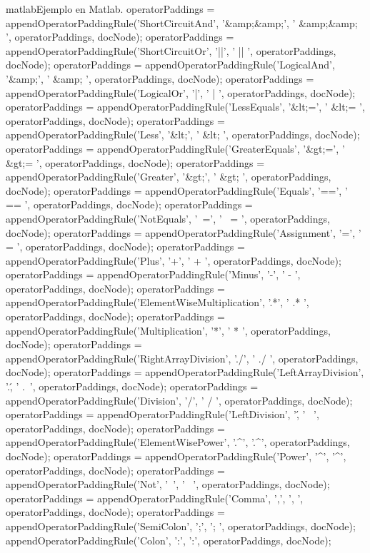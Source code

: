 \begin{sourcecode}{matlab}{Ejemplo en Matlab.}
            operatorPaddings = appendOperatorPaddingRule('ShortCircuitAnd', '&amp;&amp;', ' &amp;&amp; ', operatorPaddings, docNode);
            operatorPaddings = appendOperatorPaddingRule('ShortCircuitOr', '||', ' || ', operatorPaddings, docNode);
            operatorPaddings = appendOperatorPaddingRule('LogicalAnd', '&amp;', ' &amp; ', operatorPaddings, docNode);
            operatorPaddings = appendOperatorPaddingRule('LogicalOr', '|', ' | ', operatorPaddings, docNode);
            operatorPaddings = appendOperatorPaddingRule('LessEquals', '&lt;=', ' &lt;= ', operatorPaddings, docNode);
            operatorPaddings = appendOperatorPaddingRule('Less', '&lt;', ' &lt; ', operatorPaddings, docNode);
            operatorPaddings = appendOperatorPaddingRule('GreaterEquals', '&gt;=', ' &gt;= ', operatorPaddings, docNode);
            operatorPaddings = appendOperatorPaddingRule('Greater', '&gt;', ' &gt; ', operatorPaddings, docNode);
            operatorPaddings = appendOperatorPaddingRule('Equals', '==', ' == ', operatorPaddings, docNode);
            operatorPaddings = appendOperatorPaddingRule('NotEquals', '~=', ' ~= ', operatorPaddings, docNode);
            operatorPaddings = appendOperatorPaddingRule('Assignment', '=', ' = ', operatorPaddings, docNode);
            operatorPaddings = appendOperatorPaddingRule('Plus', '+', ' + ', operatorPaddings, docNode);
            operatorPaddings = appendOperatorPaddingRule('Minus', '-', ' - ', operatorPaddings, docNode);
            operatorPaddings = appendOperatorPaddingRule('ElementWiseMultiplication', '.*', ' .* ', operatorPaddings, docNode);
            operatorPaddings = appendOperatorPaddingRule('Multiplication', '*', ' * ', operatorPaddings, docNode);
            operatorPaddings = appendOperatorPaddingRule('RightArrayDivision', './', ' ./ ', operatorPaddings, docNode);
            operatorPaddings = appendOperatorPaddingRule('LeftArrayDivision', '.\', ' .\ ', operatorPaddings, docNode);
            operatorPaddings = appendOperatorPaddingRule('Division', '/', ' / ', operatorPaddings, docNode);
            operatorPaddings = appendOperatorPaddingRule('LeftDivision', '\', ' \ ', operatorPaddings, docNode);
            operatorPaddings = appendOperatorPaddingRule('ElementWisePower', '.^', '.^', operatorPaddings, docNode);
            operatorPaddings = appendOperatorPaddingRule('Power', '^', '^', operatorPaddings, docNode);
            operatorPaddings = appendOperatorPaddingRule('Not', '~', ' ~', operatorPaddings, docNode);
            operatorPaddings = appendOperatorPaddingRule('Comma', ',', ', ', operatorPaddings, docNode);
            operatorPaddings = appendOperatorPaddingRule('SemiColon', ';', '; ', operatorPaddings, docNode);
            appendOperatorPaddingRule('Colon', ':', ':', operatorPaddings, docNode);
            

\end{sourcecode}
